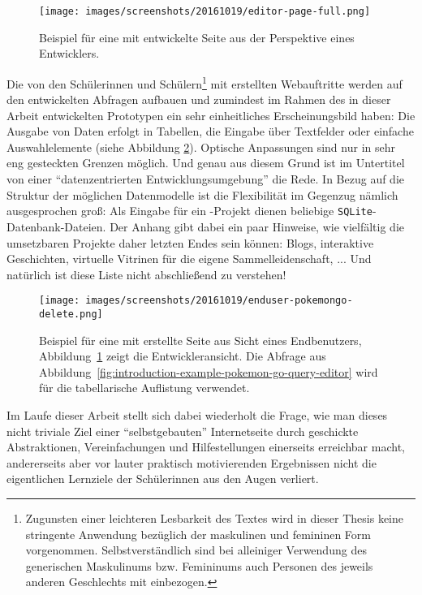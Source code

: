 \begin{figure}[p]
  \texttt{[image: images/screenshots/20161019/editor-page-full.png]}
  \caption{Beispiel für eine mit \idename{} entwickelte Seite aus der Perspektive eines Entwicklers.}
  \label{fig:introduction-example-pokemon-go-page-editor}
\end{figure}

Die von den Schülerinnen und Schülern\footnote{Zugunsten einer leichteren Lesbarkeit des Textes wird in dieser Thesis keine stringente Anwendung bezüglich der maskulinen und femininen Form vorgenommen. Selbstverständlich sind bei alleiniger Verwendung des generischen Maskulinums bzw. Femininums auch Personen des jeweils anderen Geschlechts mit einbezogen.} mit \idename{} erstellten Webauftritte werden auf den entwickelten Abfragen aufbauen und zumindest im Rahmen des in dieser Arbeit entwickelten Prototypen ein sehr einheitliches Erscheinungsbild haben: Die Ausgabe von Daten erfolgt in Tabellen, die Eingabe über Textfelder oder einfache Auswahlelemente (siehe Abbildung \ref{fig:introduction-example-pokemon-go-catch}). Optische Anpassungen sind nur in sehr eng gesteckten Grenzen möglich. Und genau aus diesem Grund ist im Untertitel von einer "`datenzentrierten Entwicklungsumgebung"' die Rede. In Bezug auf die Struktur der möglichen Datenmodelle ist die Flexibilität im Gegenzug nämlich ausgesprochen groß: Als Eingabe für ein \idename{}-Projekt dienen beliebige \texttt{SQLite}-Datenbank-Dateien. Der Anhang gibt dabei ein paar Hinweise, wie vielfältig die umsetzbaren Projekte daher letzten Endes sein können: Blogs, interaktive Geschichten, virtuelle Vitrinen für die eigene Sammelleidenschaft, ... Und natürlich ist diese Liste nicht abschließend zu verstehen!

\begin{figure}[p]
  \texttt{[image: images/screenshots/20161019/enduser-pokemongo-delete.png]}
  \caption{Beispiel für eine mit \idename{} erstellte Seite aus Sicht eines Endbenutzers,  Abbildung~\ref{fig:introduction-example-pokemon-go-page-editor} zeigt die Entwickleransicht. Die Abfrage aus Abbildung~\ref{fig:introduction-example-pokemon-go-query-editor} wird für die tabellarische Auflistung verwendet.}
  \label{fig:introduction-example-pokemon-go-catch}
\end{figure}

Im Laufe dieser Arbeit stellt sich dabei wiederholt die Frage, wie man dieses nicht triviale Ziel einer "`selbstgebauten"' Internetseite durch geschickte Abstraktionen, Vereinfachungen und Hilfestellungen einerseits erreichbar macht, andererseits aber vor lauter praktisch motivierenden Ergebnissen nicht die eigentlichen Lernziele der Schülerinnen aus den Augen verliert.

